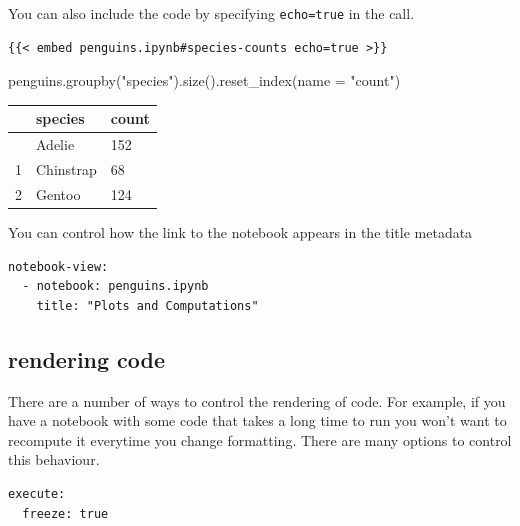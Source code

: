 \documentclass[
  letterpaper,
  DIV=11,
  numbers=noendperiod,
  oneside]{scrartcl}
\newenvironment{Shaded}{\begin{snugshade}}{\end{snugshade}}
\newcommand{\NormalTok}[1]{\textcolor[rgb]{0.00,0.23,0.31}{#1}}
\newcommand{\OperatorTok}[1]{\textcolor[rgb]{0.37,0.37,0.37}{#1}}
\newcommand{\StringTok}[1]{\textcolor[rgb]{0.13,0.47,0.30}{#1}}
\begin{document}
You can also include the code by specifying \texttt{echo=true} in the
call.

\begin{verbatim}
{{< embed penguins.ipynb#species-counts echo=true >}}
\end{verbatim}

\begin{Shaded}
\begin{Highlighting}[]
\NormalTok{penguins.groupby(}\StringTok{"species"}\NormalTok{).size().reset\_index(name }\OperatorTok{=} \StringTok{"count"}\NormalTok{)}
\end{Highlighting}
\end{Shaded}

\hypertarget{species-counts}{}
\begin{longtable}[]{@{}lll@{}}
\toprule\noalign{}
& species & count \\
\midrule\noalign{}
\endhead
\bottomrule\noalign{}
\endlastfoot
0 & Adelie & 152 \\
1 & Chinstrap & 68 \\
2 & Gentoo & 124 \\
\end{longtable}

You can control how the link to the notebook appears in the title
metadata 

\begin{verbatim}
notebook-view:
  - notebook: penguins.ipynb
    title: "Plots and Computations"
\end{verbatim}

\hypertarget{rendering-code}{%
\subsection{rendering code}\label{rendering-code}}

There are a number of ways to control the rendering of code. For
example, if you have a notebook with some code that takes a long time to
run you won't want to recompute it everytime you change formatting.
There are many options to control this behaviour. 

\begin{verbatim}
execute:
  freeze: true 
\end{verbatim}
\end{document}

